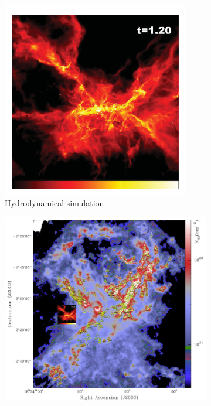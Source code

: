 \begin{figure}
\center
    \centering
    \begin{subfigure}[b]{0.48\textwidth}
    	\centering
        \includegraphics[width=0.9\textwidth]{Figures/0_bate2012.png}
        \caption{Hydrodynamical simulation}
        \label{Fig:0_bate2012}
    \end{subfigure}
    \begin{subfigure}[b]{0.48\textwidth}
        \includegraphics[width=\textwidth]{Figures/0_aquila_bate.png}

\end{subfigure}
\end{figure}

